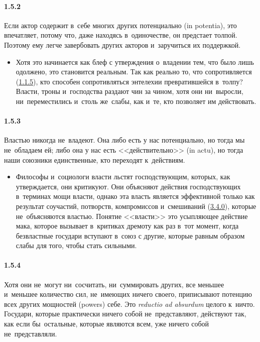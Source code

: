 \paragraph{1.5.2}\hypertarget{par:1.5.2}{} Если актор содержит в~себе многих других потенциально (in potentia), это впечатляет, потому что, даже находясь в~одиночестве, он предстает толпой. Поэтому ему легче завербовать других акторов и~заручиться их поддержкой.
	\begin{itemize}
	\item Хотя это начинается как блеф с утверждения о~владении тем, что было лишь одолжено, это становится реальным. Так как реально то, что сопротивляется (\hyperlink{par:1.1.5}{1.1.5}), кто способен сопротивляться энтелехии превратившейся в~толпу? Власти, троны и~господства раздают чин за чином, хотя они ни~выросли, ни~переместились и~столь же~слабы, как и~те, кто позволяет им действовать.
	\end{itemize}

\paragraph{1.5.3}\hypertarget{par:1.5.3}{} Властью никогда не~владеют. Она либо есть у нас потенциально, но тогда мы не~обладаем ей; либо она у нас есть <<действительно>> (in actu), но тогда наши союзники единственные, кто переходят к~действиям.
	\begin{itemize}
	\item Философы и~социологи власти льстят господствующим, которых, как утверждается, они критикуют. Они объясняют действия господствующих в~терминах мощи власти, однако эта власть является эффективной только как результат соучастий, потворств, компромиссов и~смешиваний (\hyperlink{par:3.4.0}{3.4.0}), которые не~объясняются властью. Понятие <<власти>> это усыпляющее действие мака, которое вызывает в~критиках дремоту как раз в~тот момент, когда безвластные государи вступают в~союз с другие, которые равным образом слабы для того, чтобы стать сильными.
	\end{itemize}

\paragraph{1.5.4}\hypertarget{par:1.5.4}{} Хотя они не~могут ни~сосчитать, ни~суммировать других, все меньшее и~меньшее количество сил, не~имеющих ничего своего, приписывают потенцию всех других мощностей (powers) себе. Это {\itshape reductio ad absurdum} целого к~ничто. Государи, которые практически ничего собой не~представляют, действуют так, как если бы~остальные, которые являются всем, уже ничего собой не~представляли.